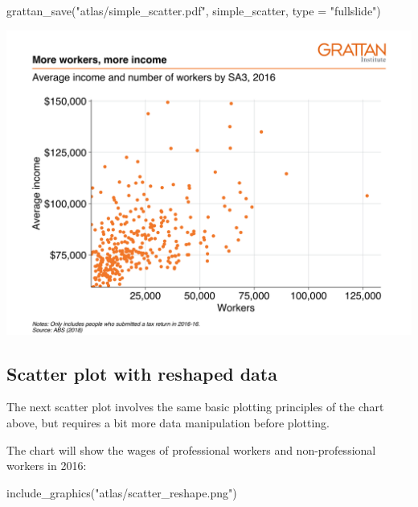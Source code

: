 \documentclass[
]{book}
\newenvironment{Shaded}{\begin{snugshade}}{\end{snugshade}}
\newcommand{\AttributeTok}[1]{\textcolor[rgb]{0.77,0.63,0.00}{#1}}
\newcommand{\FunctionTok}[1]{\textcolor[rgb]{0.00,0.00,0.00}{#1}}
\newcommand{\NormalTok}[1]{#1}
\newcommand{\StringTok}[1]{\textcolor[rgb]{0.31,0.60,0.02}{#1}}
\begin{document}
\begin{Shaded}
\begin{Highlighting}[]
\FunctionTok{grattan\_save}\NormalTok{(}\StringTok{"atlas/simple\_scatter.pdf"}\NormalTok{, simple\_scatter, }\AttributeTok{type =} \StringTok{"fullslide"}\NormalTok{)}
\end{Highlighting}
\end{Shaded}

\includegraphics{atlas/simple_scatter.png}

\hypertarget{scatter-plot-with-reshaped-data}{%
\subsection{Scatter plot with reshaped data}\label{scatter-plot-with-reshaped-data}}

The next scatter plot involves the same basic plotting principles of the chart above, but requires a bit more data manipulation before plotting.

The chart will show the wages of professional workers and non-professional workers in 2016:

\begin{Shaded}
\begin{Highlighting}[]
\FunctionTok{include\_graphics}\NormalTok{(}\StringTok{"atlas/scatter\_reshape.png"}\NormalTok{)}
\end{Highlighting}
\end{Shaded}
\end{document}
